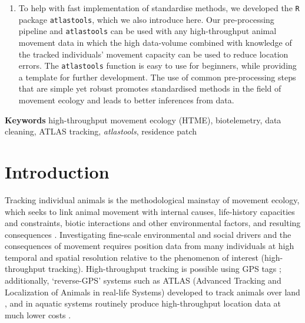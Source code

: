 \documentclass[10pt,paper=a4,headings=standardclasses
]{scrartcl}
\begin{document}
\begin{enumerate}
    \item To help with fast implementation of standardise methods, we developed the \texttt{R} package \texttt{atlastools}, which we also introduce here.
    Our pre-processing pipeline and \texttt{atlastools} can be used with any high-throughput animal movement data in which the high data-volume combined with knowledge of the tracked individuals’ movement capacity can be used to reduce location errors.
    The \texttt{atlastools} function is easy to use for beginners, while providing a template for further development.
    The use of common pre-processing steps that are simple yet robust promotes standardised methods in the field of movement ecology and leads to better inferences from data.
\end{enumerate}

\textbf{Keywords} high-throughput movement ecology (HTME), biotelemetry, data cleaning, ATLAS tracking, \textit{atlastools}, residence patch

\linenumbers

\section{Introduction}

Tracking individual animals is the methodological mainstay of movement ecology, which seeks to link animal movement with internal causes, life-history capacities and constraints, biotic interactions and other environmental factors, and resulting consequences \citep{nathan2008a, holyoak2008}. 
Investigating fine-scale environmental and social drivers and the consequences of movement requires position data from many individuals at high temporal and spatial resolution relative to the phenomenon of interest (high-throughput tracking).
High-throughput tracking is possible using GPS tags \citep[see recent examples in][]{strandburg-peshkin2015, papageorgiou2019, harel2016}; additionally, ‘reverse-GPS’ systems such as ATLAS (Advanced Tracking and Localization of Animals in real-life Systems) developed to track animals over land  \citep[][see also \citealt{maccurdy2009, maccurdy2019}]{toledo2014, weiser2016, toledo2016,toledo2020}, and in aquatic systems \citep{hussey2015, baktoft2019, baktoft2017,jung2015, aspillaga2021} routinely produce high-throughput location data at much lower costs \citep{wikelski2007}.
\end{document}
